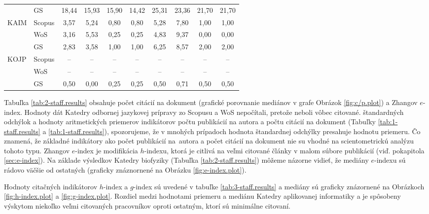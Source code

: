 \begin{table}
\begin{tabularx}{\textwidth}{XXcccc@{\hspace{3ex}}cccc}
      & GS     & 18,44       & 15,93 & 15,90 & 14,42 & 25,31   & 23,36 & 21,70 & 21,70 \\[3ex]
 KAIM & Scopus & 3,57        & 5,24  & 0,80  & 0,80  & 5,28    & 7,80  & 1,00  & 1,00  \\
      & WoS    & 3,16        & 5,53  & 0,25  & 0,25  & 4,83    & 9,37  & 0,00  & 0,00  \\
      & GS     & 2,83        & 3,58  & 1,00  & 1,00  & 6,25    & 8,57  & 2,00  & 2,00  \\[3ex]
 KOJP & Scopus & --          & --    & --    & --    & --      & --    & --    & --    \\
      & WoS    & --          & --    & --    & --    & --      & --    & --    & --    \\
      & GS     & 0,50        & 0,00  & 0,25  & 0,25  & 0,50    & 0,71  & 0,50  & 0,50  \\[0.5ex]
  \bottomrule
\end{tabularx}
\end{table}

Tabuľka \ref{tab:2-staff.results} obsahuje počet citácií na dokument (grafické
porovnanie mediánov v grafe Obrázok \ref{fig:c/p.plot}) a Zhangov $e$-index.
Hodnoty dát Katedry odbornej jazykovej prípravy zo Scopusu a WoS nepočítali,
pretože neboli vôbec citované.  štandardných odchýlok a hodnoty aritmetických
priemerov indikátorov počtu publikácií na autora a počtu citácií na dokument
(Tabuľky \ref{tab:1-staff.results} a \ref{tab:1-staff.results}), spozorujeme, že v
mnohých prípadoch hodnota štandardnej odchýlky presahuje hodnotu priemeru.  Čo
znamená, že základné indikátory ako počet publikácií na~autora a počet citácií
na dokument nie su vhodné na scientometrickú analýzu tohoto typu.  Zhangov
$e$-index  je modifikácia $h$-indexu, ktorá je citlivá na veľmi citované články
v malom súbore publikácií (viď. pokapitola \ref{sec:e-index}).  Na základe
výsledkov Katedry biofyziky (Tabuľka \ref{tab:2-staff.results}) môžeme názorne
vidieť, že mediány $e$-indexu sú rádovo väčšie od ostatných (graficky
znáznornené na Obrázku \ref{fig:e-index.plot}).

Hodnoty citačných indikátorov $h$-index a $g$-index sú uvedené v tabuľke
\ref{tab:3-staff.results} a mediány sú graficky znázornené na Obrázkoch
\ref{fig:h-index.plot} a \ref{fig:g-index.plot}.  Rozdiel medzi hodnotami
priemeru a mediánu Katedry aplikovanej informatiky a je spôsobeny výskytom
niekoľko veľmi citovaných pracovníkov oproti ostatným, ktorí sú minimálne
citovaní.

